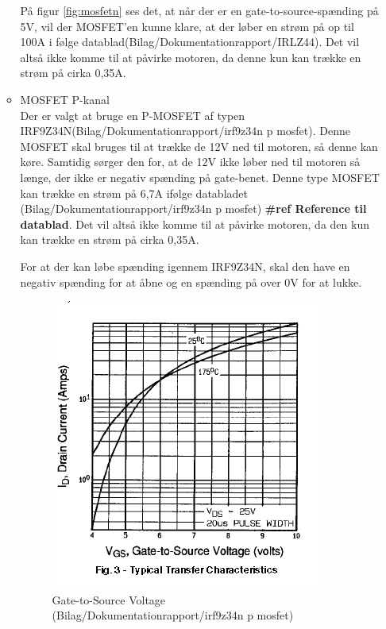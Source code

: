 \begin{itemize}
\begin{itemize}
	På figur \ref{fig:mosfetn} ses det, at når der er en gate-to-source-spænding på 5V, vil der MOSFET'en kunne klare, at der løber en strøm på op til 100A i følge datablad(Bilag/Dokumentationrapport/IRLZ44). Det vil altså ikke komme til at påvirke motoren, da denne kun kan trække en strøm på cirka 0,35A. 
	
\item MOSFET P-kanal \\
	Der er valgt at bruge en P-MOSFET af typen IRF9Z34N(Bilag/Dokumentationrapport/irf9z34n p mosfet). Denne MOSFET skal bruges til at trække de 12V ned til motoren, så denne kan køre. Samtidig sørger den for, at de 12V ikke løber ned til motoren så længe, der ikke er negativ spænding på gate-benet. 
	Denne type MOSFET kan trække en strøm på 6,7A ifølge databladet (Bilag/Dokumentationrapport/irf9z34n p mosfet) \textbf{\#ref Reference til datablad}. Det vil altså ikke komme til at påvirke motoren, da den kun kan trække en strøm på cirka 0,35A. 
	
	For at der kan løbe spænding igennem IRF9Z34N, skal den have en negativ spænding for at åbne og en spænding på over 0V for at lukke. 
	
	\begin{figure}[H]
		\centering
		\includegraphics[width=\textwidth]{DesignOgImplementering/images/grafp}
		\caption{Gate-to-Source Voltage (Bilag/Dokumentationrapport/irf9z34n p mosfet)}
		\label{fig:mosfetp}
	\end{figure}
	

\end{itemize}
\end{itemize}
